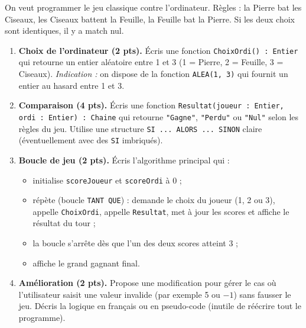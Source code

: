 \documentclass[11pt]{article}
\begin{document}
\begin{exercice}
On veut programmer le jeu classique contre l'ordinateur. Règles : la Pierre bat les Ciseaux, les Ciseaux battent la Feuille, la Feuille bat la Pierre. Si les deux choix sont identiques, il y a match nul.

\begin{enumerate}
    \item \textbf{Choix de l'ordinateur (2 pts).} Écris une fonction \texttt{ChoixOrdi() : Entier} qui retourne un entier aléatoire entre 1 et 3 (1 = Pierre, 2 = Feuille, 3 = Ciseaux). \emph{Indication :} on dispose de la fonction \texttt{ALEA(1, 3)} qui fournit un entier au hasard entre 1 et 3.
    \item \textbf{Comparaison (4 pts).} Écris une fonction \texttt{Resultat(joueur : Entier, ordi : Entier) : Chaine} qui retourne \texttt{"Gagne"}, \texttt{"Perdu"} ou \texttt{"Nul"} selon les règles du jeu. Utilise une structure \texttt{SI ... ALORS ... SINON} claire (éventuellement avec des \texttt{SI} imbriqués).
    \item \textbf{Boucle de jeu (2 pts).} Écris l'algorithme principal qui :
    \begin{itemize}
        \item initialise \texttt{scoreJoueur} et \texttt{scoreOrdi} à 0 ;
        \item répète (boucle \texttt{TANT QUE}) : demande le choix du joueur (1, 2 ou 3), appelle \texttt{ChoixOrdi}, appelle \texttt{Resultat}, met à jour les scores et affiche le résultat du tour ;
        \item la boucle s'arrête dès que l'un des deux scores atteint 3 ;
        \item affiche le grand gagnant final.
    \end{itemize}
    \item \textbf{Amélioration (2 pts).} Propose une modification pour gérer le cas où l'utilisateur saisit une valeur invalide (par exemple 5 ou $-1$) sans fausser le jeu. Décris la logique en français ou en pseudo-code (inutile de réécrire tout le programme).
\end{enumerate}
\end{exercice}
\end{document}
